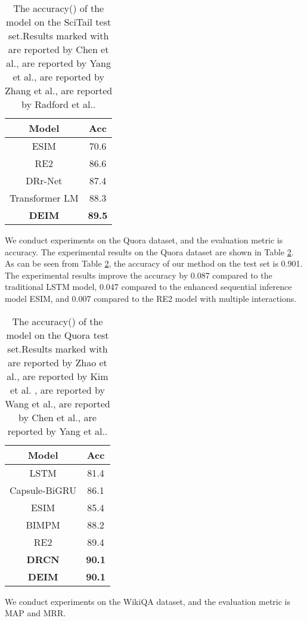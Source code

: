 \documentclass[review]{elsarticle}
\begin{document}
\begin{table}[htbp]
 \centering
  \caption{\label{tab:4}The accuracy() of the model on the SciTail test  set.Results marked with     are reported by Chen et al.\cite{chen2017enhanced},  are reported by Yang et al.\cite{yang2019simple}, are reported by Zhang et al.\cite{zhang2019drr},  are reported by Radford et al.\cite{radford2018improving}.}
\begin{tabular}{cc}
 \toprule
Model & Acc\\
 \midrule
ESIM & 70.6 \\
RE2 & 86.6 \\
DRr-Net & 87.4 \\
Transformer LM & 88.3 \\
\textbf{DEIM} & \textbf{89.5} \\
\bottomrule
 \end{tabular}
\end{table}
We conduct experiments on the Quora dataset, and the evaluation metric is accuracy.
The experimental results on the Quora dataset are shown in Table  \ref{tab:5}. As can be seen from Table \ref{tab:5}, the accuracy of our method on the test set is 0.901. The experimental results improve the accuracy by 0.087 compared to the traditional LSTM model, 0.047 compared to the enhanced sequential inference model ESIM, and 0.007 compared to the RE2 model with multiple interactions. 
\begin{table}[htbp]
 \centering
  \caption{\label{tab:5}The accuracy() of the model on the Quora test  set.Results marked with     are reported by Zhao et al.\cite{zhao2020algorithm},  are reported by Kim et al.\cite{kim2019semantic} ,  are reported by Wang et al.\cite{wang2017bilateral},   are reported by Chen et al.\cite{chen2017enhanced},  are reported by Yang et al.\cite{yang2019simple}.}
\begin{tabular}{cc}
 \toprule
Model & Acc\\
 \midrule
LSTM & 81.4 \\
Capsule-BiGRU & 86.1 \\
ESIM & 85.4 \\
BIMPM & 88.2 \\
RE2 & 89.4 \\
\textbf{DRCN} & \textbf{90.1} \\
\textbf{DEIM} & \textbf{90.1} \\
\bottomrule
 \end{tabular}
\end{table}
We conduct experiments on the WikiQA dataset, and the evaluation metric is MAP and MRR.
\end{document}
